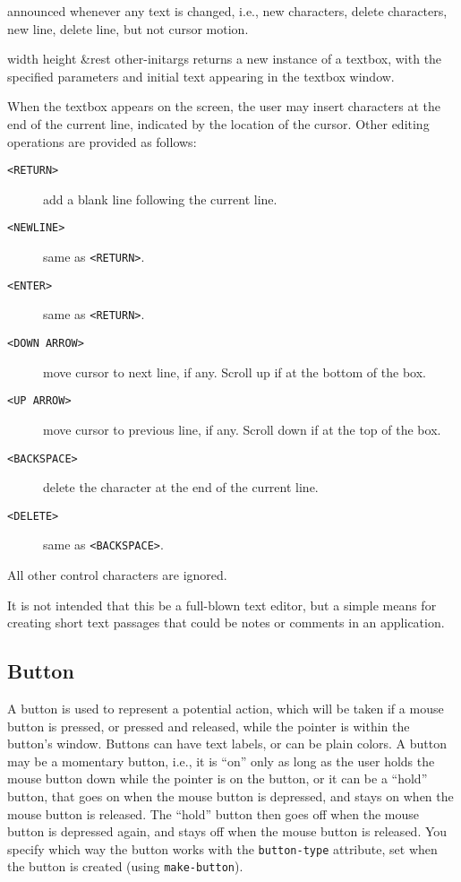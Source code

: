 \documentclass[twoside,openright,11pt]{report}
\newcommand{\tp}[1]{\texttt{#1}}
\begin{document}

{announced whenever any text is changed, i.e., new characters, delete
characters, new line, delete line, but not cursor motion.}


{width height \&rest other-initargs}
{returns a new instance of a textbox, with the specified parameters
and initial text appearing in the textbox window.}

When the textbox appears on the screen, the user may insert characters
at the end of the current line, indicated by the location of the
cursor.  Other editing operations are provided as follows:

\begin{description}
\item[\tp{<RETURN>}] add a blank line following the current line.
\item[\tp{<NEWLINE>}] same as \tp{<RETURN>}.
\item[\tp{<ENTER>}] same as \tp{<RETURN>}.
\item[\tp{<DOWN ARROW>}] move cursor to next line, if any.  Scroll
up if at the bottom of the box.
\item[\tp{<UP ARROW>}] move cursor to previous line, if any.
Scroll down if at the top of the box.
\item[\tp{<BACKSPACE>}] delete the character at the end of the
current line.
\item[\tp{<DELETE>}] same as \tp{<BACKSPACE>}.
\end{description}

All other control characters are ignored.

It is not intended that this be a full-blown text editor, but a simple
means for creating short text passages that could be notes or comments
in an application.

\subsection{Button} \label{sec:buttons}

A button is used to represent a potential action, which
will be taken if a mouse button is pressed, or pressed and released,
while the pointer is within the button's window.  Buttons can have
text labels, or can be plain colors.  A button may be a momentary
button, i.e., it is ``on'' only as long as the user holds the mouse
button down while the pointer is on the button, or it can be a
``hold'' button, that goes on when the mouse button is depressed, and
stays on when the mouse button is released.  The ``hold'' button then
goes off when the mouse button is depressed again, and stays off when
the mouse button is released.  You specify which way the button works
with the \tp{button-type} attribute, set when the button is
created (using \tp{make-button}).
\end{document}
